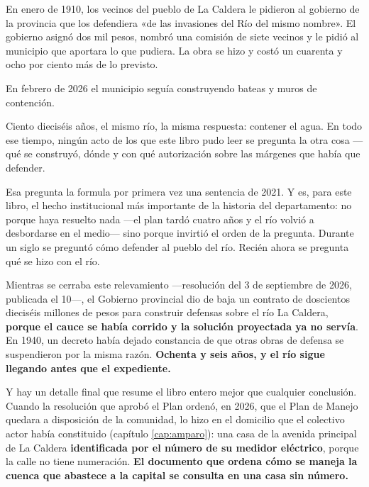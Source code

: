 En enero de 1910, los vecinos del pueblo de La Caldera le pidieron al gobierno de la
provincia que los defendiera «de las invasiones del Río del mismo nombre». El gobierno
asignó dos mil pesos, nombró una comisión de siete vecinos y le pidió al municipio que
aportara lo que pudiera. La obra se hizo y costó un cuarenta y ocho por ciento más de lo
previsto.

En febrero de 2026 el municipio seguía construyendo bateas y muros de contención.

Ciento dieciséis años, el mismo río, la misma respuesta: contener el agua. En todo ese
tiempo, ningún acto de los que este libro pudo leer se pregunta la otra cosa —qué se
construyó, dónde y con qué autorización sobre las márgenes que había que defender.

Esa pregunta la formula por primera vez una sentencia de 2021. Y es, para este libro, el
hecho institucional más importante de la historia del departamento: no porque haya resuelto
nada —el plan tardó cuatro años y el río volvió a desbordarse en el medio— sino porque
invirtió el orden de la pregunta. Durante un siglo se preguntó cómo defender al pueblo del
río. Recién ahora se pregunta qué se hizo con el río.

Mientras se cerraba este relevamiento ---resolución del 3 de septiembre de 2026, publicada el 10---, el Gobierno provincial dio de baja un contrato de doscientos dieciséis millones de pesos para construir defensas sobre el río La Caldera, \textbf{porque el cauce se había corrido y la solución proyectada ya no servía}. En 1940, un decreto había dejado constancia de que otras obras de defensa se suspendieron por la misma razón. \textbf{Ochenta y seis años, y el río sigue llegando antes que el expediente.}

Y hay un detalle final que resume el libro entero mejor que cualquier conclusión. Cuando la resolución que aprobó el Plan ordenó, en 2026, que el Plan de Manejo quedara a disposición de la comunidad, lo hizo en el domicilio que el colectivo actor había constituido (capítulo \ref{cap:amparo}): una casa de la avenida principal de La Caldera \textbf{identificada por el número de su medidor eléctrico}, porque la calle no tiene numeración. \textbf{El documento que ordena cómo se maneja la cuenca que abastece a la capital se consulta en una casa sin número.}

